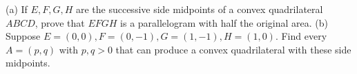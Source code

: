 (a) If $E,F,G,H$ are the successive side midpoints of a convex quadrilateral $ABCD$, prove that $EFGH$ is a parallelogram with half the original area.
(b) Suppose $E=(0,0),F=(0,-1),G=(1,-1),H=(1,0)$. Find every $A=(p,q)$ with $p,q>0$ that can produce a convex quadrilateral with these side midpoints.

